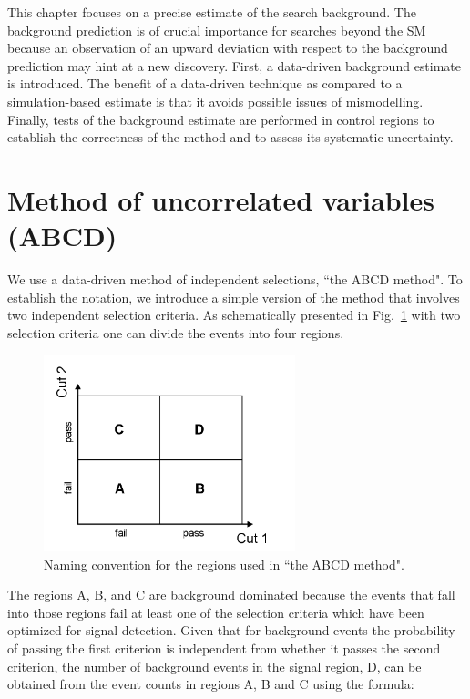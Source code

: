 This chapter focuses on a precise estimate of the search background. The
background prediction is of crucial importance for searches beyond the SM because an observation
of an upward deviation with respect to the background prediction may hint at a new discovery.
First, a data-driven background estimate is introduced. The benefit of a data-driven technique
as compared to a simulation-based estimate is that it avoids possible issues of 
mismodelling. Finally, tests of the background estimate are performed 
in control regions to establish the correctness of the method and to assess
its systematic uncertainty.


\section{Method of uncorrelated variables (ABCD)}




\label{sec:abcd}
We use a data-driven method of independent selections, ``the ABCD method".
To establish the notation, we introduce a simple version of the method that involves two 
independent selection criteria. As schematically presented in Fig.~\ref{fig:abcd} 
with two selection criteria one can divide the events into four
regions.
\begin{figure}[htbp]
\centering
\includegraphics[width=0.65\textwidth]{plots/abcd.png}
\caption{Naming convention for the regions used in ``the ABCD method".\label{fig:abcd}}
\end{figure}
The regions A, B, and C are background dominated because the events that fall into those regions fail at least 
one of the selection criteria which have been optimized for signal detection. 
Given that for background events the probability of passing the first criterion is independent 
from whether it passes the second criterion, the number
of background events in the signal region, D, can be obtained from the event counts in regions A, B and C using the formula:

